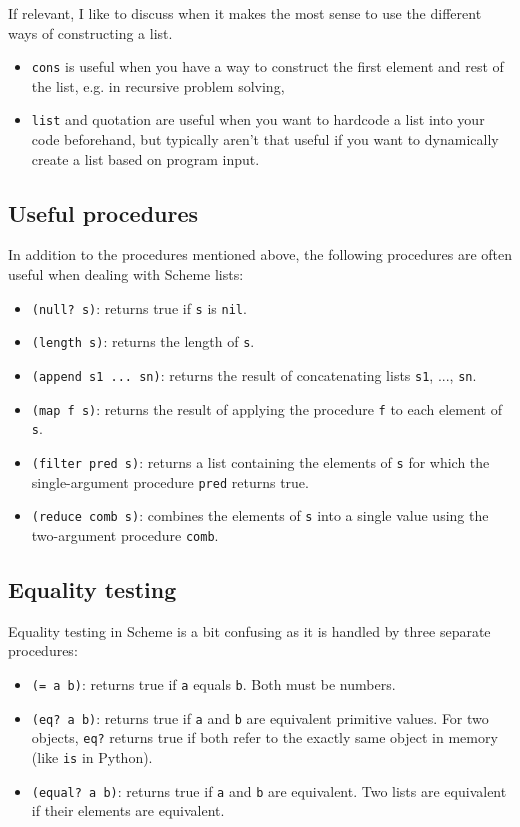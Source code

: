 \begin{meta}
If relevant, I like to discuss when it makes the most sense to use the different ways of constructing a list. 
\begin{itemize}
 \item \lstinline{cons} is useful when you have a way to construct the first element and rest of the list, e.g. in recursive problem solving, 
 \item \lstinline{list} and quotation are useful when you want to hardcode a list into your code beforehand, but typically aren't that useful if you want to dynamically create a list based on program input. 
\end{itemize}
\end{meta}

\subsection{Useful procedures}
In addition to the procedures mentioned above, the following procedures are often useful when dealing with Scheme lists: 
\begin{itemize}
  \item \lstinline{(null? s)}: returns true if \lstinline{s} is \lstinline{nil}. 
  \item \lstinline{(length s)}: returns the length of \lstinline{s}. 
  \item \lstinline{(append s1 ... sn)}: returns the result of concatenating lists \lstinline{s1}, ..., \lstinline{sn}. 
  \item \lstinline{(map f s)}: returns the result of applying the procedure \lstinline{f} to each element of \lstinline{s}. 
  \item \lstinline{(filter pred s)}: returns a list containing the elements of \lstinline{s} for which the single-argument procedure \lstinline{pred} returns true. 
  \item \lstinline{(reduce comb s)}: combines the elements of \lstinline{s} into a single value using the two-argument procedure \lstinline{comb}.
\end{itemize}

\subsection{Equality testing}
Equality testing in Scheme is a bit confusing as it is handled by three separate procedures: 
\begin{itemize}
  \item \lstinline{(= a b)}: returns true if \lstinline{a} equals \lstinline{b}. Both must be numbers.
  \item \lstinline{(eq? a b)}: returns true if \lstinline{a} and \lstinline{b} are equivalent primitive values. For two objects, \lstinline{eq?} returns true if both refer to the exactly same object in memory (like \lstinline{is} in Python). 
  \item \lstinline{(equal? a b)}: returns true if \lstinline{a} and \lstinline{b} are equivalent. Two lists are equivalent if their elements are equivalent. 
\end{itemize}


